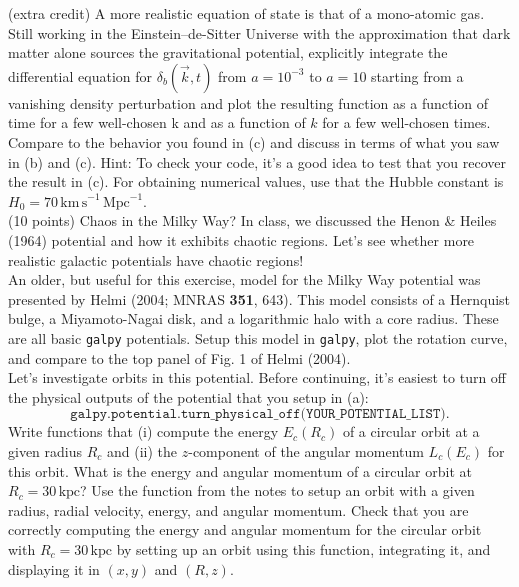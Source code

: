 \documentclass[12pt]{article}
\begin{document}
 (extra credit) A more realistic equation of state
is that of a mono-atomic gas. Still working in the Einstein--de-Sitter
Universe with the approximation that dark matter alone sources the
gravitational potential, explicitly integrate the differential
equation for $\delta_b(\vec{k},t)$ from $a = 10^{-3}$ to $a = 10$
starting from a vanishing density perturbation and plot the resulting
function as a function of time for a few well-chosen k and as a
function of $k$ for a few well-chosen times. Compare to the behavior
you found in (c) and discuss in terms of what you saw in (b) and
(c). Hint: To check your code, it's a good idea to test that you
recover the result in (c). For obtaining numerical values, use that
the Hubble constant is $H_0 =
70\,\mathrm{km\,s}^{-1}\,\mathrm{Mpc}^{-1}$.\\

 (10 points) Chaos in the Milky Way? In
class, we discussed the Henon \& Heiles (1964) potential and how it
exhibits chaotic regions. Let's see whether more realistic galactic
potentials have chaotic regions!\\

 An older, but useful for this exercise, model for
the Milky Way potential was presented by Helmi (2004; MNRAS {\bf 351},
643). This model consists of a Hernquist bulge, a Miyamoto-Nagai disk,
and a logarithmic halo with a core radius. These are all basic
\texttt{galpy} potentials. Setup this model in \texttt{galpy}, plot
the rotation curve, and compare to the top panel of Fig. 1 of Helmi
(2004).\\

 Let's investigate orbits in this potential. Before
continuing, it's easiest to turn off the physical outputs of the
potential that you setup in (a):
\[\texttt{galpy.potential.turn\_physical\_off(YOUR\_POTENTIAL\_LIST)}.\] Write
functions that (i) compute the energy $E_c(R_c)$ of a circular orbit
at a given radius $R_c$ and (ii) the $z$-component of the angular
momentum $L_c(E_c)$ for this orbit. What is the energy and angular
momentum of a circular orbit at $R_c = 30\,\mathrm{kpc}$? Use the
function from the notes to setup an orbit with a given radius, radial
velocity, energy, and angular momentum. Check that you are correctly
computing the energy and angular momentum for the circular orbit with
$R_c = 30\,\mathrm{kpc}$ by setting up an orbit using this function,
integrating it, and displaying it in $(x,y)$ and $(R,z)$.\\
\end{document}
